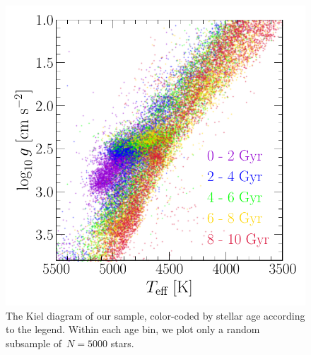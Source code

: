 \begin{figure}
\centering
\includegraphics[scale = 0.6]{kiel_diagram.pdf}
\caption{
The Kiel diagram of our sample, color-coded by stellar age according to the
legend.
Within each age bin, we plot only a random subsample of~$N = 5000$ stars.
}
\label{outflows:fig:kiel-diagram}
\end{figure}

